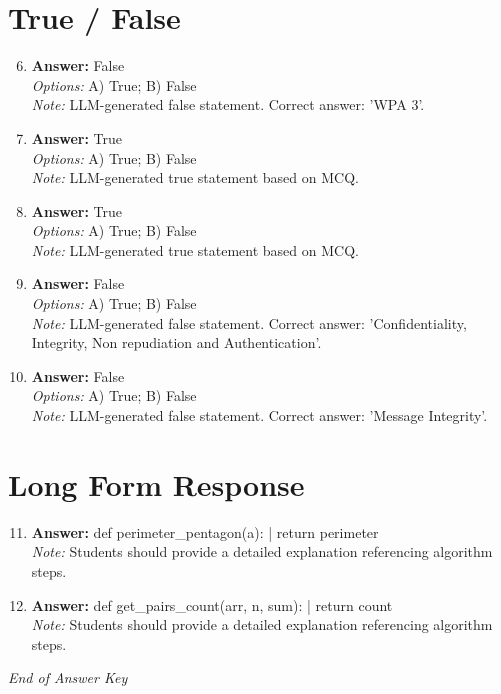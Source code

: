 \documentclass[12pt]{article}
\begin{document}
\section*{True / False}
\begin{enumerate}[label=\arabic*.]
\setcounter{enumi}{5}
\item \textbf{Answer:} False
\\ \textit{Options:} A) True; B) False
\\ \textit{Note:} LLM-generated false statement. Correct answer: 'WPA 3'.
\item \textbf{Answer:} True
\\ \textit{Options:} A) True; B) False
\\ \textit{Note:} LLM-generated true statement based on MCQ.
\item \textbf{Answer:} True
\\ \textit{Options:} A) True; B) False
\\ \textit{Note:} LLM-generated true statement based on MCQ.
\item \textbf{Answer:} False
\\ \textit{Options:} A) True; B) False
\\ \textit{Note:} LLM-generated false statement. Correct answer: 'Confidentiality, Integrity, Non repudiation and Authentication'.
\item \textbf{Answer:} False
\\ \textit{Options:} A) True; B) False
\\ \textit{Note:} LLM-generated false statement. Correct answer: 'Message Integrity'.
\end{enumerate}

\section*{Long Form Response}
\begin{enumerate}[label=\arabic*.]
\setcounter{enumi}{10}
\item \textbf{Answer:} def perimeter\_pentagon(a): | return perimeter
\\ \textit{Note:} Students should provide a detailed explanation referencing algorithm steps.
\item \textbf{Answer:} def get\_pairs\_count(arr, n, sum): | return count
\\ \textit{Note:} Students should provide a detailed explanation referencing algorithm steps.
\end{enumerate}

\vfill
\noindent\textit{End of Answer Key}
\end{document}

